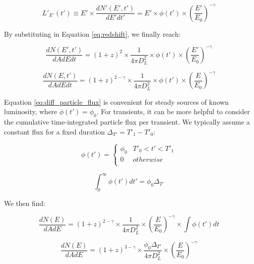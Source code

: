 \begin{equation}
L'_{E'}(t') \equiv E' \times \frac{dN'(E', t')}{dE'dt'} = E' \times \phi(t') \times \left( \frac{E'}{E_{0}}\right) ^{-\gamma}
\label{eq:def_le}
\end{equation}

By substituting in Equation \ref{eq:redshift}, we finally reach:

\begin{equation}
\frac{dN(E', t')}{dAdEdt}= (1+z)^{2} \times \frac{1}{4 \pi D_{L}^{2}} \times \phi(t') \times \left( \frac{E'}{E_{0}}\right) ^{-\gamma}
\end{equation}

 \begin{equation}
 \frac{dN(E, t')}{dAdEdt}= (1+z)^{2 - \gamma} \times \frac{1}{4 \pi D_{L}^{2}} \times \phi(t') \times \left( \frac{E}{E_{0}}\right) ^{-\gamma}
 \label{eq:diff_particle_flux}
 \end{equation}
 
Equation \ref{eq:diff_particle_flux} is convenient for steady sources of known luminosity, where $\phi(t') = \phi_{0}$. For transients, it can be more helpful to consider the cumulative time-integrated particle flux per transient. We typically assume a constant flux for a fixed duration $\Delta_{T'} = T'_{1} - T'_{0}$:

 \begin{equation}
\phi(t')  = 
\begin{cases}
\phi_{0} & T'_{0} < t' < T'_{1}\\
0 & otherwise\\
\end{cases}
\end{equation}

\begin{equation}
\int_{0}^{\infty} \phi(t') dt' = \phi_{0} \Delta_{T'}
\end{equation}

We then find:

 \begin{equation}
 \frac{dN(E)}{dAdE} = (1+z)^{2 - \gamma} \times \frac{1}{4 \pi D_{L}^{2}}  \times \left( \frac{E}{E_{0}}\right) ^{-\gamma} \times \int \phi(t') dt 
\end{equation}

 \begin{equation}
\frac{dN(E)}{dAdE}= (1+z)^{3 - \gamma} \times \frac{\phi_{0} \Delta_{T'}}{4 \pi D_{L}^{2}} \times \left( \frac{E}{E_{0}}\right) ^{-\gamma}
\end{equation}
 

